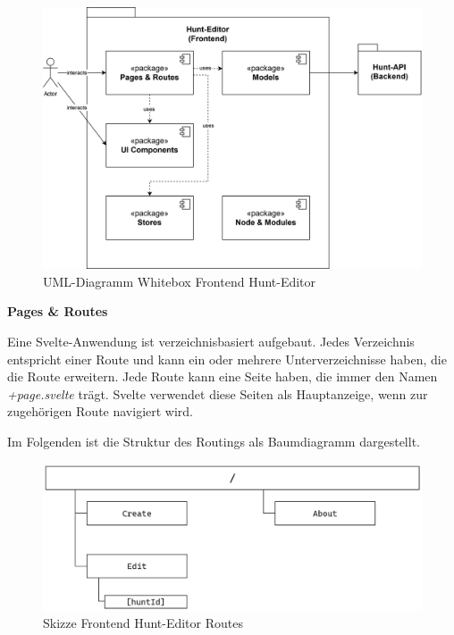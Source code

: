 \begin{figure}[H]
  \centering
  \includegraphics[width=1\textwidth]{images/PrAR-Loesung-Hunt-Editor-Components.png}
  \caption{UML-Diagramm Whitebox Frontend Hunt-Editor}
  \label{fig:whitebox-frontend}
\end{figure}

\textbf{Pages \& Routes}

Eine Svelte-Anwendung ist verzeichnisbasiert aufgebaut. Jedes Verzeichnis entspricht einer Route und kann ein oder mehrere Unterverzeichnisse haben, die die Route erweitern. Jede Route kann eine Seite haben, die immer den Namen \textit{+page.svelte} trägt. Svelte verwendet diese Seiten als Hauptanzeige, wenn zur zugehörigen Route navigiert wird.

Im Folgenden ist die Struktur des Routings als Baumdiagramm dargestellt.

\begin{figure}[H]
  \centering
  \includegraphics[width=1\textwidth]{images/PrAR-Loesung-Hunt-Editor-Routes.png}
  \caption{Skizze Frontend Hunt-Editor Routes}
  \label{fig:frontend-routes}
\end{figure}

